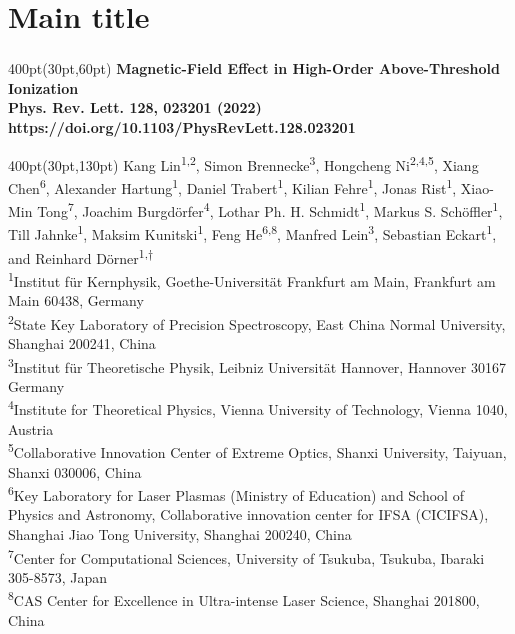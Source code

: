 \section{Main title}

\begin{frame}
\frametitle{}
\framesubtitle{}

\small
\begin{textblock*}{400pt}(30pt,60pt)
\bfseries\Large\centering
Magnetic-Field Effect in High-Order Above-Threshold Ionization \\
\vspace{5pt}
\small Phys. Rev. Lett. 128, 023201 (2022) \\
\Tiny https://doi.org/10.1103/PhysRevLett.128.023201
\end{textblock*}


\begin{textblock*}{400pt}(30pt,130pt)
\centering\footnotesize
Kang Lin\textsuperscript{1,2},
Simon Brennecke\textsuperscript{3},
Hongcheng Ni\textsuperscript{2,4,5},
Xiang Chen\textsuperscript{6},
Alexander Hartung\textsuperscript{1},
Daniel Trabert\textsuperscript{1},
Kilian Fehre\textsuperscript{1},
Jonas Rist\textsuperscript{1},
Xiao-Min Tong\textsuperscript{7},
Joachim Burgd\"orfer\textsuperscript{4},
Lothar Ph. H. Schmidt\textsuperscript{1},
Markus S. Sch\"offler\textsuperscript{1},
Till Jahnke\textsuperscript{1},
Maksim Kunitski\textsuperscript{1},
Feng He\textsuperscript{6,8},
Manfred Lein\textsuperscript{3},
Sebastian Eckart\textsuperscript{1},
and Reinhard D\"orner\textsuperscript{1,$\dagger$} \\

\vspace{10pt}
\tiny
\textsuperscript{1}Institut für Kernphysik, Goethe-Universität Frankfurt am Main, Frankfurt am Main 60438, Germany\\
\textsuperscript{2}State Key Laboratory of Precision Spectroscopy, East China Normal University, Shanghai 200241, China\\
\textsuperscript{3}Institut für Theoretische Physik, Leibniz Universität Hannover, Hannover 30167 Germany\\
\textsuperscript{4}Institute for Theoretical Physics, Vienna University of Technology, Vienna 1040, Austria\\
\textsuperscript{5}Collaborative Innovation Center of Extreme Optics, Shanxi University, Taiyuan, Shanxi 030006, China\\
\textsuperscript{6}Key Laboratory for Laser Plasmas (Ministry of Education) and School of Physics and Astronomy, Collaborative innovation center for IFSA (CICIFSA), Shanghai Jiao Tong University, Shanghai 200240, China\\
\textsuperscript{7}Center for Computational Sciences, University of Tsukuba, Tsukuba, Ibaraki 305-8573, Japan\\
\textsuperscript{8}CAS Center for Excellence in Ultra-intense Laser Science, Shanghai 201800, China
\end{textblock*}


\end{frame}
